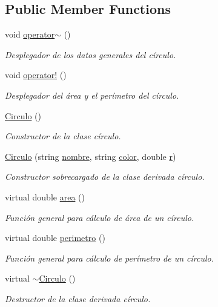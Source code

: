 \subsection*{Public Member Functions}
\begin{DoxyCompactItemize}
\item 
void \hyperlink{class_circulo_a8db226b0c3bad5b8a01d60afb45838c7}{operator$\sim$} ()
\begin{DoxyCompactList}\small\item\em Desplegador de los datos generales del círculo. \end{DoxyCompactList}\item 
void \hyperlink{class_circulo_a64bd2cabfdbca872d44bf1eb13f59cbb}{operator!} ()
\begin{DoxyCompactList}\small\item\em Desplegador del área y el perímetro del círculo. \end{DoxyCompactList}\item 
\hyperlink{class_circulo_a6933bf908b78a4167684081a3a8f257f}{Circulo} ()
\begin{DoxyCompactList}\small\item\em Constructor de la clase círculo. \end{DoxyCompactList}\item 
\hyperlink{class_circulo_aeb2f4326330d682f8daf9aad09fd8063}{Circulo} (string \hyperlink{class_circulo_a4ab11e667cbed98312c5f1688bf486c0}{nombre}, string \hyperlink{class_circulo_a617c127941b509f6265ab59c141d7fea}{color}, double \hyperlink{class_circulo_a90d30bcb1273ecf1467b78d890504bcb}{r})
\begin{DoxyCompactList}\small\item\em Constructor sobrecargado de la clase derivada círculo. \end{DoxyCompactList}\item 
virtual double \hyperlink{class_circulo_aded0c4ee374eb000f59d8d8da01ad72d}{area} ()
\begin{DoxyCompactList}\small\item\em Función general para cálculo de área de un círculo. \end{DoxyCompactList}\item 
virtual double \hyperlink{class_circulo_acc35f8fdd7303fca9fe54b0da458bdf2}{perimetro} ()
\begin{DoxyCompactList}\small\item\em Función general para cálculo de perímetro de un círculo. \end{DoxyCompactList}\item 
virtual \hyperlink{class_circulo_a8efe39e0e89487519cd802f0738d3bf4}{$\sim$\+Circulo} ()
\begin{DoxyCompactList}\small\item\em Destructor de la clase derivada círculo. \end{DoxyCompactList}\end{DoxyCompactItemize}
